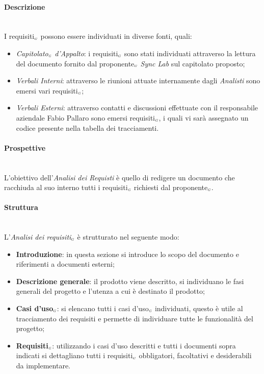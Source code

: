 \paragraph{Descrizione}\label{ProcessiPrimariProspettiveAnalisiDeiRequisitiDescrizione}\mbox{}\\
I requisiti$_{\scaleto{G}{3pt}}$ possono essere individuati in diverse fonti, quali:
\begin{itemize}
	\item \textit{Capitolato$_{\scaleto{G}{3pt}}$ d'Appalto}: i requisiti$_{\scaleto{G}{3pt}}$ sono stati individuati attraverso la lettura del documento fornito dal proponente$_{\scaleto{G}{3pt}}$ \textit{Sync Lab} sul capitolato proposto;
	\item \textit{Verbali Interni}: attraverso le riunioni attuate internamente dagli \textit{Analisti} sono emersi vari requisiti$_{\scaleto{G}{3pt}}$;
	\item \textit{Verbali Esterni}: attraverso contatti e discussioni effettuate con il responsabile aziendale Fabio Pallaro sono emersi requisiti$_{\scaleto{G}{3pt}}$, i quali vi sarà assegnato un codice presente nella tabella dei tracciamenti.
\end{itemize}
\paragraph{Prospettive}\label{ProcessiPrimariProspettiveAnalisiDeiRequisitiProspettive}\mbox{}\\
L'obiettivo dell'\textit{Analisi dei Requisti} è quello di redigere un documento che racchiuda al suo interno tutti i requisiti$_{\scaleto{G}{3pt}}$ richiesti dal proponente$_{\scaleto{G}{3pt}}$.
\paragraph{Struttura}\label{ProcessiPrimariProspettiveAnalisiDeiRequisitiStruttura}\mbox{}\\ %
L'\textit{Analisi dei requisiti$_{\scaleto{G}{3pt}}$} è strutturato nel seguente modo:
\begin{itemize}
	\item \textbf{Introduzione}: in questa sezione si introduce lo scopo del documento e riferimenti a documenti esterni;
	\item \textbf{Descrizione generale}: il prodotto viene descritto, si individuano le fasi generali del progetto e l'utenza a cui è destinato il prodotto;
	\item \textbf{Casi d'uso$_{\scaleto{G}{3pt}}$}: si elencano tutti i casi d'uso$_{\scaleto{G}{3pt}}$ individuati, questo è utile al tracciamento dei requisiti e permette di individuare tutte le funzionalità del progetto;
	\item \textbf{Requisiti$_{\scaleto{G}{3pt}}$}: utilizzando i casi d'uso descritti e tutti i documenti sopra indicati si dettagliano tutti i requisiti$_{\scaleto{G}{3pt}}$ obbligatori, facoltativi e desiderabili da implementare.
\end{itemize}
